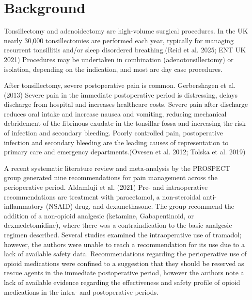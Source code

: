 \documentclass[
  letterpaper,
  DIV=11,
  numbers=noendperiod]{scrreprt}
\begin{document}
\section{Background}\label{background-1}

Tonsillectomy and adenoidectomy are high-volume surgical procedures. In
the UK nearly 30,000 tonsillectomies are performed each year, typically
for managing recurrent tonsillitis and/or sleep disordered
breathing.(Reid et al. 2025; ENT UK 2021) Procedures may be undertaken
in combination (adenotonsillectomy) or isolation, depending on the
indication, and most are day case procedures.

After tonsillectomy, severe postoperative pain is common. Gerbershagen
et al. (2013) Severe pain in the immediate postoperative period is
distressing, delays discharge from hospital and increases healthcare
costs. Severe pain after discharge reduces oral intake and increase
nausea and vomiting, reducing mechanical debridement of the fibrinous
exudate in the tonsillar fossa and increasing the risk of infection and
secondary bleeding. Poorly controlled pain, postoperative infection and
secondary bleeding are the leading causes of representation to primary
care and emergency departments.(Ovesen et al. 2012; Tolska et al. 2019)

A recent systematic literature review and meta-analysis by the PROSPECT
group generated nine recommendations for pain management across the
perioperative period. Aldamluji et al. (2021) Pre- and intraoperative
recommendations are treatment with paracetamol, a non-steroidal
anti-inflammatory (NSAID) drug, and dexamethasone. The group recommend
the addition of a non-opioid analgesic (ketamine, Gabapentinoid, or
dexmedetomidine), where there was a contraindication to the basic
analgesic regimen described. Several studies examined the intraoperative
use of tramadol; however, the authors were unable to reach a
recommendation for its use due to a lack of available safety data.
Recommendations regarding the perioperative use of opioid medications
were confined to a suggestion that they should be reserved as rescue
agents in the immediate postoperative period, however the authors note a
lack of available evidence regarding the effectiveness and safety
profile of opioid medications in the intra- and postoperative periods.
\end{document}
